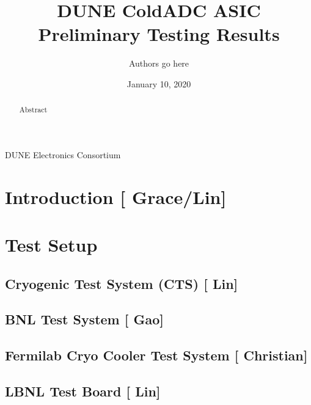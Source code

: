 \documentclass[12pt]{article}
\begin{document}

\title{DUNE ColdADC ASIC Preliminary Testing Results}

\date{January 10, 2020}
\author{Authors go here}
%	
%	

\maketitle

\centerline{DUNE Electronics Consortium}



\begin{abstract}
Abstract
\end{abstract}


\newpage
\tableofcontents

\newpage

\section{Introduction [{\color{red} Grace/Lin}] }




\section{Test Setup}

\subsection{Cryogenic Test System (CTS) [{\color{red} Lin}] }

\subsection{BNL Test System [{\color{red} Gao}] }

\subsection{Fermilab Cryo Cooler Test System [{\color{red} Christian}] }

\subsection{LBNL Test Board  [{\color{red} Lin}] }

\end{document}
